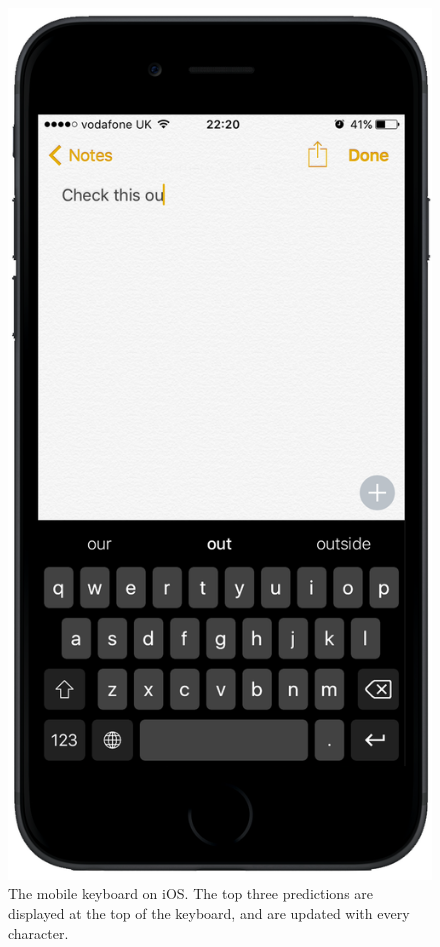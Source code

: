 \documentclass[a4paper, 12pt]{report}
\begin{document}
\begin{figure}[h]
\captionsetup{justification=centering}
\centering
\includegraphics[scale=0.2]{Images/MobileKeyboardOnScreen.png}
\caption{The mobile keyboard on iOS. The top three predictions are displayed at the top of the keyboard, and are updated with every character.}
\end{figure}
\end{document}
